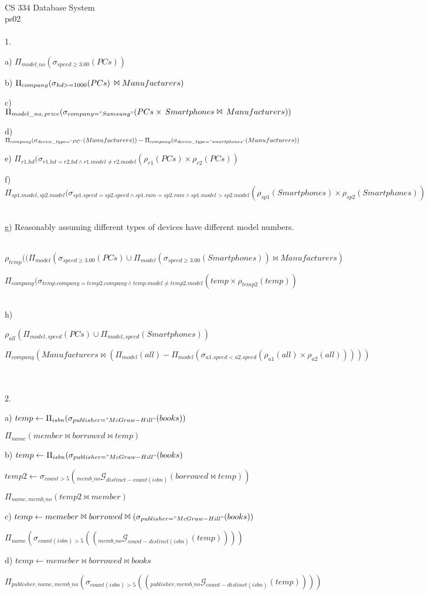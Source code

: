 \documentclass{article}
\begin{document}
~\\
CS 334 Database System ~\\
ps02 ~\\\\
1. \par 
a) $\Pi_{model\_no}(\sigma_{speed \geqslant 3.00} (PCs))$
\par 
b) $\Pi_{company}(\sigma_{hd>=1000}(PCs)\thinspace \Join Manufacturers )$
\par
c) $\Pi_{model\_no, \thinspace price}(\sigma_{company = "Samsung"}(PCs \times \thinspace Smartphones \Join \thinspace Manufacturers))$
\par
d) $\Pi_{company}(\sigma_{device\_type="PC"}(Manufacturers))-\Pi_{company}(\sigma_{device\_type="smartphones"}(Manufacturers))$
\par
e) $\Pi_{r1.hd}(\sigma_{r1.hd=r2.hd \wedge r1.model \ne r2.model }(\rho_{r1}(PCs) \times \rho_{r2}(PCs))$
\par
f) $\Pi_{sp1.model, sp2.model}(\sigma_{sp1.speed=sp2.speed \wedge sp1.ram=sp2.ram \wedge sp1.model>sp2.model}(\rho_{sp1}(Smartphones) \times \rho_{sp2}(Smartphones))$ ~\par
g) Reasonably assuming different types of devices have different model numbers. ~\par
$\rho_{temp}((\Pi_{model}(\sigma_{speed\geqslant 3.00}(PCs)\cup \Pi_{model}(\sigma_{speed\geqslant 3.00}(Smartphones))\Join Manufacturers)$ \par
$\Pi_{company}(\sigma_{temp.company = temp2.company \wedge temp.model \ne temp2.model }(temp \times \rho_{temp2}(temp))$ ~\par
h) \par
$\rho_{all}(\Pi_{model,speed}(PCs) \cup \Pi_{model, speed}(Smartphones))$ \par
$\Pi_{company}(Manufacturers \Join (\Pi_{model}(all)-\Pi_{model}(\sigma_{a1.speed<a2.speed}(\rho_{a1}(all) \times \rho_{a2}(all)))))$
\par
~\\\\
2. \par
a) $temp \leftarrow \Pi_{isbn}(\sigma_{publisher="McGraw-Hill"}(books))$ \par
$\Pi_{name}(member \Join borrowed \Join temp)$ \par
b) $temp \leftarrow \Pi_{isbn}(\sigma_{publisher="McGraw-Hill"}(books)$ \par
$temp2 \leftarrow \sigma_{count>5}(_{memb\_no}\mathcal{G}_{distinct-count(isbn)}(borrowed \Join temp))$ \par
$\Pi_{name, memb\_no}(temp2 \Join member)$ \par
c) $temp \leftarrow memeber \Join borrowed \Join (\sigma_{publisher="McGraw-Hill"}(books))$ \par
$\Pi_{name}(\sigma_{count(isbn) >5}((_{memb\_no}\mathcal{G}_{count-distinct(isbn)}(temp))))$ \par 
d) $temp \leftarrow memeber \Join borrowed \Join books$ \par
$\Pi_{publisher,name,memb\_no}(\sigma_{count(isbn) >5}((_{publisher, memb\_no}\mathcal{G}_{count-distinct(isbn)}(temp))))$ \par 
\end{document}

